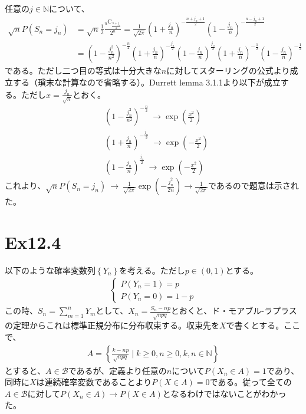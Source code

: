 \documentclass{article}
\begin{document}
任意の$j \in \mathbb{N}$について、
\begin{align*}
	\sqrt{n} P\left( S_n = j_n \right) &= \sqrt{n} \frac{1}{2} \frac{ {}_n \mathrm{C} _\frac{n+j_n}{2}}{2^n} = \frac{1}{\sqrt{2\pi}} \left( 1 + \frac{j_n}{n} \right)^{-\frac{n+j_n+1}{2}}\left( 1 - \frac{j_n}{n} \right)^{-\frac{n-j_n+1}{2}}\\[10pt]
	&= \left( 1- \frac{j_n^2}{n^2} \right)^{-\frac{n}{2}} \left( 1+\frac{j_n}{n} \right)^{-\frac{j_n}{2}} \left( 1- \frac{j_n}{n} \right)^{\frac{j_n}{2}}\left( 1+\frac{j_n}{n} \right)^{-\frac{1}{2}} \left( 1-\frac{j_n}{n} \right)^{-\frac{1}{2}}
\end{align*}
である。ただし二つ目の等式は十分大きな$n$に対してスターリングの公式より成立する（瑣末な計算なので省略する）。Durrett lemma 3.1.1より以下が成立する。ただし$x = \frac{j_n}{\sqrt{n}}$とおく。
\begin{align*}
	&\left( 1-\frac{j_n^2}{n^2} \right)^{-\frac{n}{2}}\ \to \exp\left( \frac{x^2}{2} \right)\\[8pt]
	&\left( 1+\frac{j_n}{n} \right)^{-\frac{j_n}{2}}\ \to \exp\left( -\frac{x^2}{2} \right)\\[8pt]
	&\left( 1-\frac{j_n}{n} \right)^{\frac{j_n}{2}}\ \to \exp\left( -\frac{x^2}{2} \right)
\end{align*}
これより、$\sqrt{n} P\left( S_n = j_n \right)\ \to\ \frac{1}{\sqrt{2\pi}} \exp\left( -\frac{j_n^2}{2n} \right) \to \frac{1}{\sqrt{2\pi}}$であるので題意は示された。


\section{Ex12.4}
以下のような確率変数列$\left\{ Y_n \right\}$を考える。ただし$p\in (0,1)$とする。
\begin{align*}
\begin{cases}
	P\left( Y_n = 1 \right) = p\\[8pt]
	P\left( Y_n = 0 \right) = 1-p
\end{cases}
\end{align*}
この時、$S_n = \sum_{m=1}^n Y_m$として、$X_n = \frac{S_n -np}{\sqrt{npq}}$とおくと、ド・モアブル-ラプラスの定理からこれは標準正規分布に分布収束する。収束先を$X$で書くとする。ここで、
\begin{align*}
	A = \left\{ \frac{k-np}{\sqrt{npq}} \mid k \geq 0, n\geq 0, k,n \in \mathbb{N} \right\}
\end{align*}
とすると、$A\in \mathcal{B}$であるが、定義より任意の$n$について$P\left( X_n \in A \right) = 1$であり、同時に$X$は連続確率変数であることより$P\left( X \in A \right) = 0$である。従って全ての$A\in \mathcal{B}$に対して$P\left( X_n \in A \right)\to P\left( X\in A\right)$となるわけではないことがわかった。
\end{document}
